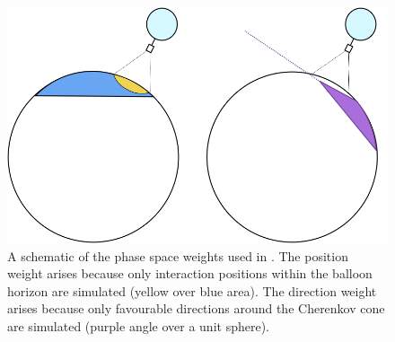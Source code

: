 

\begin{figure}[!h]\centering
  \includegraphics[width=.8\linewidth, trim = 0 6.5cm 0 0, clip]{./Figs/icemcWeightScheme.png}
  \caption{A schematic of the phase space weights used in \icemc. The
    position weight arises because only interaction positions within
    the balloon horizon are simulated (yellow over blue area).
  The direction weight arises because only favourable directions around the
  Cherenkov cone are simulated (purple angle over a unit sphere).}
  \label{fig:weights}
\end{figure}
